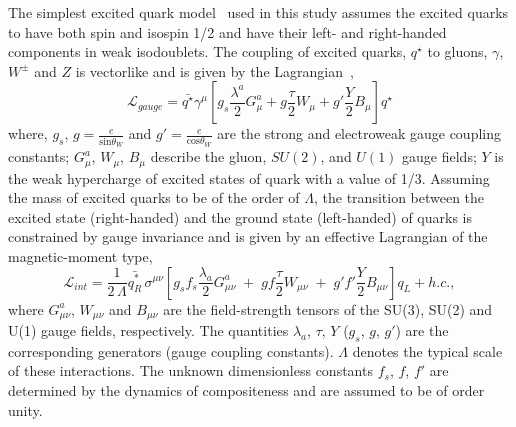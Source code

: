 The simplest excited quark model~\cite{Baur:1989kv} used in this study assumes the excited quarks to have both spin and isospin 1/2 and have
their left- and right-handed components in weak isodoublets.
The coupling of excited quarks, $q^{\star}$ to gluons, $\gamma$, $W^{\pm}$ and $Z$ is vectorlike and is given by the Lagrangian~\cite{Baur:1989kv},
\begin{equation}
\mathcal{L}_{gauge} = \bar{q^{\star}}\gamma^{\mu} \left[ g_{s}\frac{\lambda^{a}}{2}G_{\mu}^{a} + g\frac{\tau}{2}W_{\mu} + g'\frac{Y}{2}B_{\mu} \right]q^{\star}
\end{equation}
where, $g_{s}$, $g=\frac{e}{\text{sin}\theta_{W}}$ and $g'=\frac{e}{\text{cos}\theta_{W}}$ are the strong and electroweak gauge coupling constants; 
$G_{\mu}^{a}$, $W_{\mu}$, $B_{\mu}$ describe the gluon, $SU(2)$, and $U(1)$ gauge fields; $Y$ is the weak hypercharge of excited states of quark 
with a value of 1/3. Assuming the mass of excited quarks to be of the order of $\Lambda$, the transition between the excited state (right-handed)
and the ground state (left-handed) of quarks is constrained by gauge invariance and is given by an effective Lagrangian of the magnetic-moment type, 
\begin{equation}
{\mathcal L}_{int} = \frac{1}{2\,\Lambda}\bar{q^{\ast}_{R}} \, \sigma^{\mu\nu}
\left[g_{s}f_{s}\frac{\lambda_{a}}{2}G^{a}_{\mu\nu}\;+\;gf\frac{\tau}{2}W_{\mu\nu}\;+\;g'f'\frac{Y}{2}B_{\mu\nu} \right] q_{L} + h.c.,
\label{eq:Lagrangian1}
\end{equation}
where $G^{a}_{\mu\nu}$, $W_{\mu\nu}$ and $B_{\mu\nu}$ are the field-strength tensors of the SU(3), SU(2) and U(1) gauge fields, respectively.
The quantities $\lambda_{a}$, $\tau$, $Y$ ($g_{s}$, $g$, $g'$) are the corresponding generators (gauge coupling constants). 
$\Lambda$ denotes the typical scale of these interactions. The unknown dimensionless constants $f_{s}$, $f$, $f'$ are determined by the 
dynamics of compositeness and are assumed to be of order unity.

